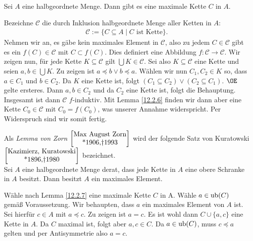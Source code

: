 \documentclass[../../main.tex]{subfiles}
\begin{document}
\begin{lem}\label{12.2.7} Sei $A$ eine halbgeordnete Menge. Dann gibt es eine maximale Kette $C$ in $A$.
\end{lem}
\begin{cproof}
Bezeichne $\mathcal{C}$ die durch Inklusion halbgeordnete Menge aller Ketten in $A$:
\begin{align*}
\mathcal{C}:=\{C\subseteq A\mid C\text{ ist Kette}\}.
\end{align*}
Nehmen wir an, es gäbe kein maximales Element in $\mathcal{C}$, also zu jedem $C\in\mathcal{C}$ gibt es ein $f(C)\in\mathcal{C}$ mit $C\subset f(C)$. Dies definiert eine Abbildung $f: \mathcal{C}\rightarrow \mathcal{C}$. Wir zeigen nun, für jede Kette $K\subseteq\mathcal{C}$ gilt $\bigcup K\in \mathcal{C}$. Sei also $K\subseteq\mathcal{C}$ eine Kette und seien $a,b\in \bigcup K$. Zu zeigen ist $a\preceq b\lor b\preceq a$. Wählen wir nun $C_1,C_2\in K$ so, dass $a\in C_1$ und $b\in C_2$. Da $K$ eine Kette ist, folgt $(C_1\subseteq C_2)\lor (C_2\subseteq C_1)$. $\OE$ gelte ersteres. Dann $a,b\in C_2$ und da $C_2$ eine Kette ist, folgt die Behauptung.\\
				
Insgesamt ist dann $\mathcal{C}$ $f$-induktiv. Mit Lemma \eqref{12.2.6} finden wir dann aber eine Kette $C_0\in\mathcal{C}$ mit $C_0=f(C_0)$, was unserer Annahme widerspricht. Per Widerspruch sind wir somit fertig.
\end{cproof}

\begin{sat}\label{12.2.8}
Als \emph{Lemma von Zorn} $\left[\begin{matrix*}\text{Max August Zorn}\\ \text{*1906,\dag 1993}\end{matrix*}\right]$ wird der folgende Satz von Kuratowski $\left[\begin{matrix*}\text{Kazimierz, Kuratowski}\\ \text{*1896,\dag 1980}\end{matrix*}\right]$ bezeichnet.\\
Sei $A$ eine halbgeordnete Menge derat, dass jede Kette in $A$ eine obere Schranke in $A$ besitzt. Dann besitzt $A$ ein maximales Element.
		
\end{sat}
\begin{cproof} Wähle nach Lemma \eqref{12.2.7} eine maximale Kette $C$ in A. Wähle $a\in\operatorname{ub}(C)$ gemäß Voraussetzung. Wir behaupten, dass $a$ ein maximales Element von $A$ ist. Sei hierfür $c\in A$ mit $a\preceq c$. Zu zeigen ist $a=c$. Es ist wohl dann $C\cup\{a,c\}$ eine Kette in $A$. Da $C$ maximal ist, folgt aber $a,c\in C$. Da $a\in\operatorname{ub}(C)$, muss $c\preceq a$ gelten und per Antisymmetrie also $a=c$.
\end{cproof}
\end{document}
